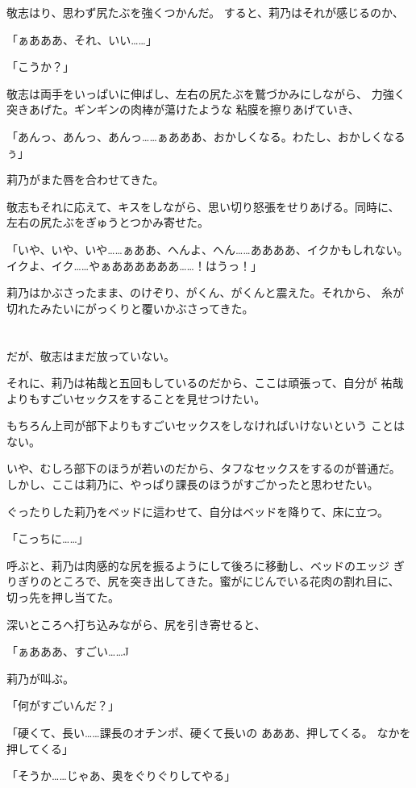 ﻿\documentclass[
    book,tate,
    line_length=30zw,
    jafontsize=12pt,
    paper=b5j,
    landscape,
    ]{jlreq}
\begin{document}
敬志はり、思わず尻たぶを強くつかんだ。
すると、莉乃はそれが感じるのか、

「ぁあああ、それ、いい……」

「こうか？」

敬志は両手をいっぱいに伸ばし、左右の尻たぶを鷲づかみにしながら、
力強く突きあげた。ギンギンの肉棒が蕩けたような 粘膜を擦りあげていき、

「あんっ、あんっ、あんっ……ぁあああ、おかしくなる。わたし、おかしくなるぅ」

莉乃がまた唇を合わせてきた。

敬志もそれに応えて、キスをしながら、思い切り怒張をせりあげる。同時に、
左右の尻たぶをぎゅうとつかみ寄せた。

「いや、いや、いや……ぁああ、へんよ、へん……ああああ、イクかもしれない。
イクよ、イク……やぁああああああ……！はうっ！」

莉乃はかぶさったまま、のけぞり、がくん、がくんと震えた。それから、
糸が切れたみたいにがっくりと覆いかぶさってきた。

\section*{}

だが、敬志はまだ放っていない。

それに、莉乃は祐哉と五回もしているのだから、ここは頑張って、自分が
祐哉よりもすごいセックスをすることを見せつけたい。

もちろん上司が部下よりもすごいセックスをしなければいけないという
ことはない。

いや、むしろ部下のほうが若いのだから、タフなセックスをするのが普通だ。
しかし、ここは莉乃に、やっぱり課長のほうがすごかったと思わせたい。

ぐったりした莉乃をベッドに這わせて、自分はベッドを降りて、床に立つ。

「こっちに……」

呼ぶと、莉乃は肉感的な尻を振るようにして後ろに移動し、ベッドのエッジ
ぎりぎりのところで、尻を突き出してきた。蜜がにじんでいる花肉の割れ目に、
切っ先を押し当てた。

深いところへ打ち込みながら、尻を引き寄せると、

「ぁあああ、すごい……J

莉乃が叫ぶ。

「何がすごいんだ？」

「硬くて、長い……課長のオチンポ、硬くて長いの あああ、押してくる。
なかを押してくる」

「そうか……じゃあ、奥をぐりぐりしてやる」
\end{document}
